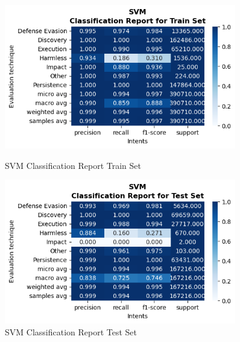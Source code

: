 \begin{figure}[H]
            \vspace{0.5cm}  %

            \begin{minipage}{\textwidth}
                \begin{minipage}[t]{0.48\textwidth}
                    \centering
                    \includegraphics[width=0.9\textwidth]{../figures/plots/section2/SVM_classification_report_for_Train_set.png}
                    \caption{SVM Classification Report Train Set}
                    \label{fig:svm_cm_train}
                \end{minipage}%
                \hfill%
                \begin{minipage}[t]{0.48\textwidth}
                    \centering
                    \includegraphics[width=0.9\textwidth]{../figures/plots/section2/SVM_classification_report_for_Test_set.png}
                    \caption{SVM Classification Report Test Set}
                    \label{fig:svm_cm_test}
                \end{minipage}  
            
            \end{minipage}
            
        \end{figure}
